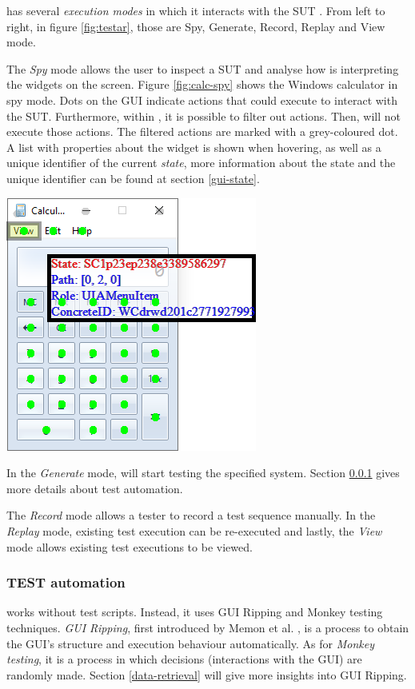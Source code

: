 \testar has several \emph{execution modes} in which it interacts with the SUT \cite{testar-manual}. From left to right, in figure \ref{fig:testar}, those are Spy, Generate, Record, Replay and View mode.

The \emph{Spy} mode allows the user to inspect a SUT and analyse how \testar is interpreting the widgets on the screen. Figure \ref{fig:calc-spy} shows the Windows calculator in spy mode. Dots on the GUI indicate actions that \testar could execute to interact with the SUT. Furthermore, within \testar, it is possible to filter out actions. Then, \testar will not execute those actions. The filtered actions are marked with a grey-coloured dot. A list with properties about the widget is shown when hovering, as well as a unique identifier of the current \emph{state}, more information about the state and the unique identifier can be found at section \ref{gui-state}.\par

\bigskip
\begingroup
\captionsetup{type=figure}
\includegraphics{images/calc-state.png}
\label{fig:calc-spy}
\endgroup

In the \emph{Generate} mode, \testar will start testing the specified system. Section \ref{testar-testauto} gives more details about \testar test automation.

The \emph{Record} mode allows a tester to record a test sequence manually. In the \emph{Replay} mode, existing test execution can be re-executed and lastly, the \emph{View} mode allows existing test executions to be viewed.

\newpage
\subsubsection{TEST automation} \label{testar-testauto}
\testar works without test scripts. Instead, it uses GUI Ripping and Monkey testing techniques. \emph{GUI Ripping}, first introduced by Memon et al. \cite{gui-ripping}, is a process to obtain the GUI's structure and execution behaviour automatically. As for \emph{Monkey testing}, it is a process in which decisions (interactions with the GUI) are randomly made. Section \ref{data-retrieval} will give more insights into GUI Ripping.

